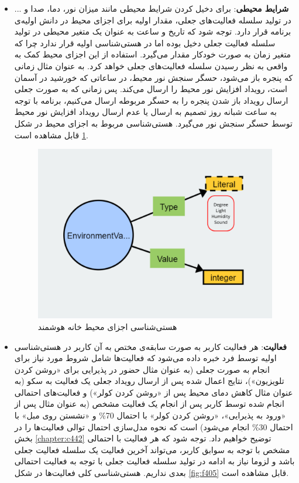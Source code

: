 \begin{itemize}
\item \textbf{شرایط محیطی}: برای دخیل کردن شرایط محیطی مانند میزان نور، دما، صدا و ... در تولید سلسله فعالیت‌های جعلی، مقدار اولیه برای اجزای محیط در دانش اولیه‌ی برنامه قرار دارد. توجه شود که تاریخ و ساعت به عنوان یک متغیر محیطی در تولید سلسله فعالیت جعلی دخیل بوده اما در هستی‌شناسی اولیه قرار ندارد چرا که متغیر زمان به صورت خودکار مقدار می‌گیرد. استفاده از این اجزای محیط کمک به واقعی به نظر رسیدن سلسله فعالیت‌های جعلی خواهد کرد. به عنوان مثال زمانی که پنجره باز می‌شود، حسگر سنجش نور محیط، در ساعاتی که خورشید در آسمان است، رویداد افزایش نور محیط را ارسال می‌کند. پس زمانی که به صورت جعلی ارسال رویداد باز شدن پنجره را به حسگر مربوطه ارسال می‌کنیم، برنامه با توجه به ساعت شبانه روز تصمیم به ارسال یا عدم ارسال رویداد افزایش نور محیط توسط حسگر سنجش نور می‌گیرد. هستی‌شناسی مربوط به اجزای محیط در شکل \ref{fig:f404} قابل مشاهده است.

\begin{figure}[htp]
\centerline{\includegraphics[width=1\textwidth]{figs/f404.png}}
\caption{هستی‌شناسی اجزای محیط خانه هوشمند}
\label{fig:f404}
\end{figure}


\item \textbf{فعالیت}: هر فعالیت کاربر به صورت سابقه‌ی مختص به آن کاربر در هستی‌شناسی اولیه توسط فرد خبره داده می‌شود که فعالیت‌ها شامل شروط مورد نیاز برای انجام به صورت جعلی (به عنوان مثال حضور در پذیرایی برای «روشن کردن تلویزیون»)، نتایج اعمال شده پس از ارسال رویداد جعلی یک فعالیت به سکو (به عنوان مثال کاهش دمای محیط پس از «روشن کردن کولر») و فعالیت‌های احتمالی انجام شده توسط کاربر پس از انجام یک فعالیت مشخص (به عنوان مثال پس از «ورود به پذیرایی»، «روشن کردن کولر» با احتمال 70\% و «نشستن روی مبل» با احتمال 30\% انجام می‌شود) است که نحوه مدل‌سازی احتمال توالی فعالیت‌ها را در بخش \ref{chapter:c442} توضیح خواهیم داد. توجه شود که هر فعالیت با احتمالی مشخص با توجه به سوابق کاربر، می‌تواند آخرین فعالیت یک سلسله فعالیت جعلی باشد و لزوما نیاز به ادامه در تولید سلسله فعالیت جعلی با توجه به فعالیت احتمالی بعدی نداریم. هستی‌شناسی کلی فعالیت‌ها در شکل \ref{fig:f405} قابل مشاهده است. 


\end{itemize}
